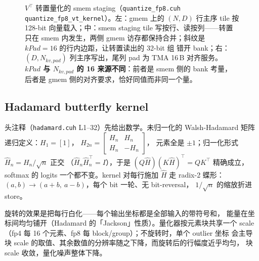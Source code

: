\begin{figure}[H]
\caption{$V^{\top}$ 转置量化的 smem staging（\texttt{quantize\_fp8.cuh}
\texttt{quantize\_fp8\_vt\_kernel}）。左：gmem 上的 $(N,D)$ 行主序 tile 按 128-bit
向量载入；中：smem staging tile 写按行、读按列——转置只在 smem 内发生，两侧
gmem 访存都保持合并；斜纹是 $kPad{=}16$ 的行内边距，让转置读出的 32-bit 组
错开 bank；右：$(D,N_{kv,pad})$ 列主序写出，尾列 pad 为 TMA 16\,B 对齐服务。
\textbf{$kPad$ 与 $N_{kv,pad}$ 的 16 来源不同}：前者是 smem 侧的 bank 考量，
后者是 gmem 侧的对齐要求，恰好同值而非同一个量。}
\label{fig:28-vt-staging}
\end{figure}

\subsection{Hadamard butterfly kernel}\label{sec:28-wht-kernel}

头注释（\texttt{hadamard.cuh} L1--32）先给出数学。未归一化的 Walsh-Hadamard
矩阵递归定义：$H_1=[1]$，
$H_{2n}=\left[\begin{smallmatrix} H_n & H_n\\ H_n & -H_n\end{smallmatrix}\right]$，
元素全是 $\pm1$；归一化形式 $\hat H_n = H_n/\sqrt{n}$ 正交
（$\hat H_n\hat H_n^{\top}=I$），于是 $(Q\hat H)(K\hat H)^{\top}=QK^{\top}$
精确成立，softmax 的 logits 一个都不变。kernel 对每行施加 $\hat H$ 走
radix-2 蝶形：$(a,b)\to(a{+}b,\ a{-}b)$，每个 bit 一轮、无 bit-reversal，
$1/\sqrt{n}$ 的缩放折进 store。

旋转的效果是把每行白化——每个输出坐标都是全部输入的带符号和，
能量在坐标间均匀铺开（Hadamard 的「Jackson」性质）。量化器按元素块共享一个
scale（fp4 每 16 个元素、fp8 每 block/group）；不旋转时，单个 outlier 坐标
会主导块 scale 的取值、其余数值的分辨率随之下降，而旋转后的行幅度近乎均匀，
块 scale 收敛，量化噪声整体下降。

